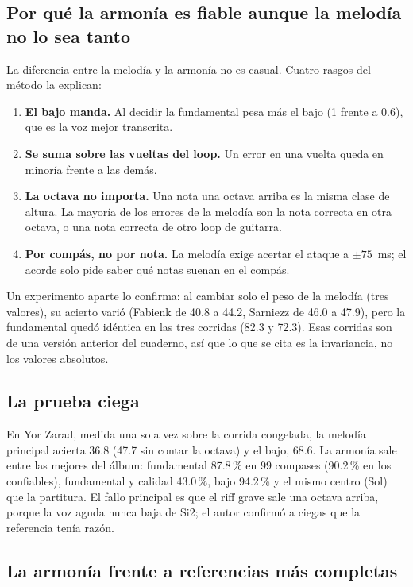 \subsection{Por qué la armonía es fiable aunque la melodía no lo sea tanto}

La diferencia entre la melodía y la armonía no es casual. Cuatro rasgos del método la explican:
\begin{enumerate}
  \item \textbf{El bajo manda.} Al decidir la fundamental pesa más el bajo (1 frente a 0.6), que es la voz mejor
  transcrita.
  \item \textbf{Se suma sobre las vueltas del loop.} Un error en una vuelta queda en minoría frente a las demás.
  \item \textbf{La octava no importa.} Una nota una octava arriba es la misma clase de altura. La mayoría de los errores
  de la melodía son la nota correcta en otra octava, o una nota correcta de otro loop de guitarra.
  \item \textbf{Por compás, no por nota.} La melodía exige acertar el ataque a $\pm75$~ms; el acorde solo pide saber qué
  notas suenan en el compás.
\end{enumerate}

Un experimento aparte lo confirma: al cambiar solo el peso de la melodía (tres valores), su acierto varió (Fabienk de
40.8 a 44.2, Sarniezz de 46.0 a 47.9), pero la fundamental quedó idéntica en las tres corridas (82.3 y 72.3). Esas
corridas son de una versión anterior del cuaderno, así que lo que se cita es la invariancia, no los valores absolutos.

\subsection{La prueba ciega}

En Yor Zarad, medida una sola vez sobre la corrida congelada, la melodía principal acierta 36.8 (47.7 sin contar la
octava) y el bajo, 68.6. La armonía sale entre las mejores del álbum: fundamental 87.8\,\% en 99 compases (90.2\,\% en los
confiables), fundamental y calidad 43.0\,\%, bajo 94.2\,\% y el mismo centro (Sol) que la partitura. El fallo principal es
que el riff grave sale una octava arriba, porque la voz aguda nunca baja de Si2; el autor confirmó a ciegas que la
referencia tenía razón.

\subsection{La armonía frente a referencias más completas}

